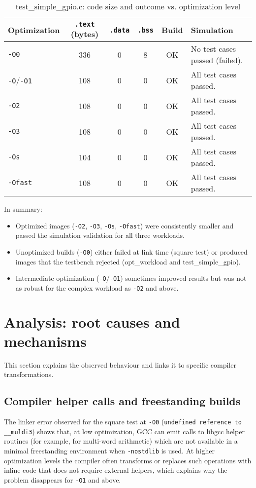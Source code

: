 \begin{table}[htbp]
  \centering
  \caption{test\_simple\_gpio.c: code size and outcome vs. optimization level}
  \label{tab:simple-gpio}
  \begin{tabularx}{\textwidth}{@{} l c c c c >{\raggedright\arraybackslash}X @{}}
    \toprule
    \textbf{Optimization}
      & \textbf{\texttt{.text} (bytes)}
      & \textbf{\texttt{.data}}
      & \textbf{\texttt{.bss}}
      & \textbf{Build}
      & \textbf{Simulation} \\
    \midrule
    \texttt{-O0}            & 336 & 0 & 8   & OK & No test cases passed (failed). \\
    \texttt{-O}/\texttt{-O1} & 108 & 0 & 0   & OK & All test cases passed. \\
    \texttt{-O2}            & 108 & 0 & 0   & OK & All test cases passed. \\
    \texttt{-O3}            & 108 & 0 & 0   & OK & All test cases passed. \\
    \texttt{-Os}            & 104 & 0 & 0   & OK & All test cases passed. \\
    \texttt{-Ofast}         & 108 & 0 & 0   & OK & All test cases passed. \\
    \bottomrule
  \end{tabularx}
\end{table}

\noindent In summary:
\begin{itemize}
  \item Optimized images (\texttt{-O2}, \texttt{-O3}, \texttt{-Os}, \texttt{-Ofast}) were consistently smaller and passed the simulation validation for all three workloads.
  \item Unoptimized builds (\texttt{-O0}) either failed at link time (square test) or produced images that the testbench rejected (opt\_workload and test\_simple\_gpio).
  \item Intermediate optimization (\texttt{-O}/\texttt{-O1}) sometimes improved results but was not as robust for the complex workload as \texttt{-O2} and above.
\end{itemize}

\section{Analysis: root causes and mechanisms}
This section explains the observed behaviour and links it to specific compiler transformations.

\subsection{Compiler helper calls and freestanding builds}
The linker error observed for the square test at \texttt{-O0} (\texttt{undefined reference to \_\_muldi3}) shows that, at low optimization, GCC can emit calls to libgcc helper routines (for example, for multi-word arithmetic) which are not available in a minimal freestanding environment when \texttt{-nostdlib} is used. At higher optimization levels the compiler often transforms or replaces such operations with inline code that does not require external helpers, which explains why the problem disappears for \texttt{-O1} and above.

